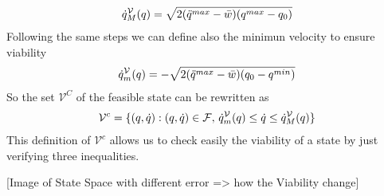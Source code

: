 \documentclass{article}
\begin{document}
\begin{equation} \begin{aligned} 
    \dot{q}^{\mathcal{V}}_M(q) = \sqrt{2 (\ddot{q}^{max}-\bar{w}) (q^{max} - q_0)}
    \end{aligned} 
\end{equation}
Following the same steps we can define also the minimun velocity to ensure viability
\begin{equation} \begin{aligned} 
    \dot{q}^{\mathcal{V}}_m(q) = - \sqrt{2 (\ddot{q}^{max}-\bar{w}) (q_0 - q^{min})}
    \end{aligned} 
\end{equation}
So the set $\mathcal{V}^C$ of the feasible state can be rewritten as
\begin{equation} \begin{aligned} 
    \mathcal{V}^c = \{ (q,\dot{q}) : (q, \dot{q}) \in \mathcal{F}, \, \dot{q}^{\mathcal{V}}_m(q) \le \dot{q} \le \dot{q}^{\mathcal{V}}_M(q) \}
    \end{aligned} 
\end{equation}
This definition of $\mathcal{V}^c$ allows us to check easily the viability of a state by just verifying three inequalities.

[Image of State Space with different error => how the Viability change]
\end{document}
